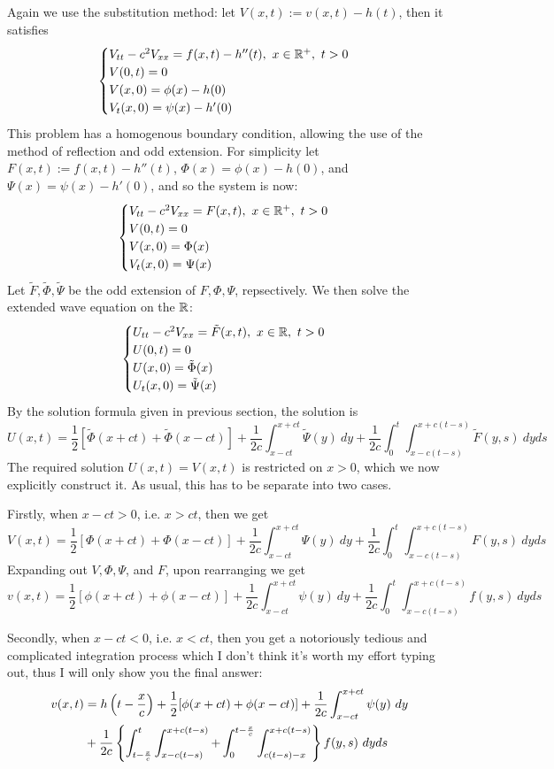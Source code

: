 Again we use the substitution method: let $V(x,t):= v(x,t)-h(t)$, then it satisfies 
\[\begin{cases}
    V_{tt} - c^2 V_{xx} = f(x,t)-h''(t),\ x\in {\mathbb R}^+,\ t>0\\
    V(0,t) = 0\\
    V(x,0) = \phi(x)-h(0)\\
    V_t(x,0) = \psi(x)-h'(0)
\end{cases}\]
This problem has a homogenous boundary condition, allowing the use of the method of reflection and odd extension. For simplicity let $F(x,t) := f(x,t) -h''(t)$, $\Phi(x) = \phi(x)-h(0)$, and $\Psi(x) = \psi(x) -h'(0)$, and so the system is now:
\[\begin{cases}
    V_{tt} - c^2 V_{xx} = F(x,t),\ x\in {\mathbb R}^+,\ t>0\\
    V(0,t) = 0\\
    V(x,0) = \Phi(x)\\
    V_t(x,0) = \Psi(x)
\end{cases}\]
Let $\tilde{F}, \tilde{\Phi}, \tilde{\Psi}$ be the odd extension of $F, \Phi, \Psi$, repsectively. We then solve the extended wave equation on the ${\mathbb R}$:
\[\begin{cases}
    U_{tt} - c^2 V_{xx} = \tilde F(x,t),\ x\in {\mathbb R},\ t>0\\
    U(0,t) = 0\\
    U(x,0) = \tilde\Phi(x)\\
    U_t(x,0) = \tilde\Psi(x)
\end{cases}\]
By the solution formula given in previous section, the solution is 
\[U(x,t) = \frac{1}{2}[\tilde\Phi(x+ct) + \tilde\Phi(x-ct)] + \frac{1}{2c}\int_{x-ct}^{x+ct} \tilde\Psi(y)\ dy + \frac{1}{2c} \int_{0}^{t}\int_{x-c(t-s)}^{x+c(t-s)} \tilde F(y,s)\ dyds\]
The required solution $U(x,t) = V(x,t)$ is restricted on $x>0$, which we now explicitly construct it. As usual, this has to be separate into two cases.


Firstly, when $x-ct>0$, i.e. $x>ct$, then we get 
\[V(x,t) = \frac{1}{2}[\Phi(x+ct) + \Phi(x-ct)] + \frac{1}{2c}\int_{x-ct}^{x+ct} \Psi(y)\ dy + \frac{1}{2c} \int_{0}^{t}\int_{x-c(t-s)}^{x+c(t-s)}  F(y,s)\ dyds\]
Expanding out $V, \Phi, \Psi$, and $F$, upon rearranging we get 
\[v(x,t) = \frac{1}{2}[\phi(x+ct) + \phi(x-ct)] + \frac{1}{2c}\int_{x-ct}^{x+ct} \psi(y)\ dy + \frac{1}{2c} \int_{0}^{t}\int_{x-c(t-s)}^{x+c(t-s)}  f(y,s)\ dyds\]

Secondly, when $x-ct<0$, i.e. $x<ct$, then you get a notoriously tedious and complicated integration process which I don't think it's worth my effort typing out, thus I will only show you the final answer:
\begin{align*}
    v(x,t) &= h \left(t-\frac{x}{c}\right) + \frac{1}{2}[\phi(x+ct) + \phi(x-ct)] + \frac{1}{2c}\int_{x-ct}^{x+ct} \psi(y)\ dy \\
    &+ \frac{1}{2c}\left\{\int_{t-\frac{x}{c}}^t \int_{x-c(t-s)}^{x+c(t-s)} + \int_{0}^{t-\frac{x}{c}} \int_{c(t-s)-x}^{x+c(t-s)}\right\} f(y,s)\ dyds
\end{align*}

